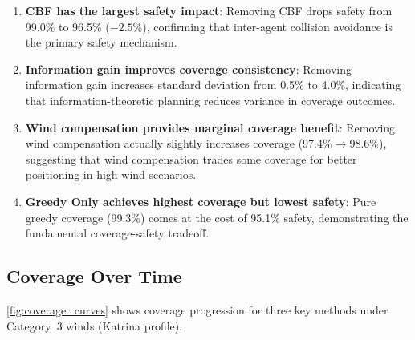 \documentclass[11pt,twocolumn]{article}
\providecommand{\Cref}[1]{\ref{#1}}
\theoremstyle{definition}
\begin{document}
\begin{enumerate}[leftmargin=*]
    \item \textbf{CBF has the largest safety impact}: Removing CBF drops safety from 99.0\% to 96.5\% ($-2.5$\%), confirming that inter-agent collision avoidance is the primary safety mechanism.
    
    \item \textbf{Information gain improves coverage consistency}: Removing information gain increases standard deviation from 0.5\% to 4.0\%, indicating that information-theoretic planning reduces variance in coverage outcomes.
    
    \item \textbf{Wind compensation provides marginal coverage benefit}: Removing wind compensation actually slightly increases coverage (97.4\%$\to$98.6\%), suggesting that wind compensation trades some coverage for better positioning in high-wind scenarios.
    
    \item \textbf{Greedy Only achieves highest coverage but lowest safety}: Pure greedy coverage (99.3\%) comes at the cost of 95.1\% safety, demonstrating the fundamental coverage-safety tradeoff.
\end{enumerate}

\subsection{Coverage Over Time}
\label{sec:coverage_curves}

\Cref{fig:coverage_curves} shows coverage progression for three key methods under Category~3 winds (Katrina profile).
\end{document}
